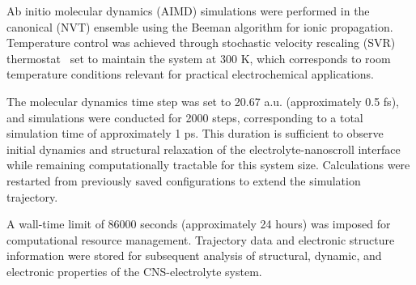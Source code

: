 Ab initio molecular dynamics (AIMD) simulations were performed in the canonical (NVT) ensemble using the Beeman algorithm for ionic propagation. Temperature control was achieved through stochastic velocity rescaling (SVR) thermostat~\cite{svr} set to maintain the system at 300 K, which corresponds to room temperature conditions relevant for practical electrochemical applications.

The molecular dynamics time step was set to 20.67 a.u. (approximately 0.5 fs), and simulations were conducted for 2000 steps, corresponding to a total simulation time of approximately 1 ps. This duration is sufficient to observe initial dynamics and structural relaxation of the electrolyte-nanoscroll interface while remaining computationally tractable for this system size. Calculations were restarted from previously saved configurations to extend the simulation trajectory.

A wall-time limit of 86000 seconds (approximately 24 hours) was imposed for computational resource management. Trajectory data and electronic structure information were stored for subsequent analysis of structural, dynamic, and electronic properties of the CNS-electrolyte system.

